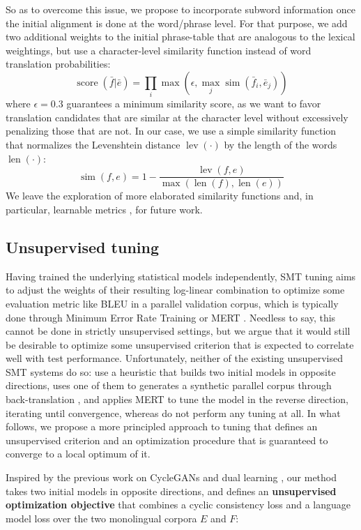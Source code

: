 \documentclass[11pt,a4paper]{article}
\DeclareMathOperator{\score}{score}
\DeclareMathOperator{\similarity}{sim}
\DeclareMathOperator{\levenshtein}{lev}
\DeclareMathOperator{\length}{len}
\begin{document}
So as to overcome this issue, we propose to incorporate subword information once the initial alignment is done at the word/phrase level. For that purpose, we add two additional weights to the initial phrase-table that are analogous to the lexical weightings, but use a character-level similarity function instead of word translation probabilities:
\[ \score ( \bar{f} | \bar{e} ) = \prod_i \max \left( \epsilon, \max_j \similarity (\bar{f}_i, \bar{e}_j) \right) \]
where $\epsilon=0.3$ guarantees a minimum similarity score, as we want to favor translation candidates that are similar at the character level without excessively penalizing those that are not. In our case, we use a simple similarity function that normalizes the Levenshtein distance $\levenshtein (\cdot)$  \citep{levenshtein1966binary} by the length of the words $\length (\cdot)$:
\[ \similarity (f, e) = 1 - \frac{\levenshtein (f, e)}{\max ( \length (f), \length (e))} \]
We leave the exploration of more elaborated similarity functions and, in particular, learnable metrics \citep{mccallum2005conditional}, for future work.


\subsection{Unsupervised tuning} \label{subsec:tuning}

Having trained the underlying statistical models independently, SMT tuning aims to adjust the weights of their resulting log-linear combination to optimize some evaluation metric like BLEU in a parallel validation corpus, which is typically done through Minimum Error Rate Training or MERT \citep{och2003MERT}. Needless to say, this cannot be done in strictly unsupervised settings, but we argue that it would still be desirable to optimize some unsupervised criterion that is expected to correlate well with test performance. Unfortunately, neither of the existing unsupervised SMT systems do so: \citet{artetxe2018usmt} use a heuristic that builds two initial models in opposite directions, uses one of them to generates a synthetic parallel corpus through back-translation \citep{sennrich2016improving}, and applies MERT to tune the model in the reverse direction, iterating until convergence, whereas \citet{lample2018phrase} do not perform any tuning at all. In what follows, we propose a more principled approach to tuning that defines an unsupervised criterion and an optimization procedure that is guaranteed to converge to a local optimum of it.

Inspired by the previous work on CycleGANs \citep{zhu2017unpaired} and dual learning \citep{he2016dual}, our method takes two initial models in opposite directions, and defines an \textbf{unsupervised optimization objective} that combines a cyclic consistency loss and a language model loss over the two monolingual corpora $E$ and $F$:
\end{document}
